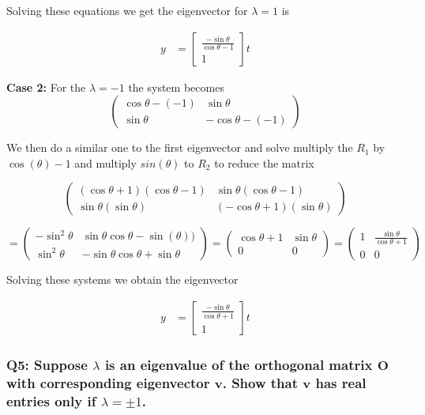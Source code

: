 \documentclass[8pt]{article}
\begin{document}
Solving these equations we get the eigenvector for $\lambda =1$ is 

\begin{align}
    y &= \begin{bmatrix}
           \frac{-\sin \theta }{\cos \theta -1} \\
           1
         \end{bmatrix}t 
\end{align}

\textbf{Case 2: }For the $\lambda =-1$ the system becomes
$$
\begin{pmatrix}
\cos \theta - (-1) & \sin \theta \\
\sin \theta & -\cos \theta -  (-1)
\end{pmatrix} 
$$

We then do a similar one to the first eigenvector and solve multiply the $R_1$ by $\cos(\theta) -1$ and multiply $sin(\theta)$ to $R_2$ to reduce the matrix

$$
\begin{pmatrix}
(\cos \theta + 1)(\cos \theta -1) & \sin \theta (\cos \theta - 1)\\
\sin \theta (\sin \theta) & (-\cos \theta +1)(\sin \theta)
\end{pmatrix} 
$$

$$
= \begin{pmatrix}
-\sin^2 \theta & \sin \theta \cos \theta - \sin(\theta))\\
\sin^2 \theta & -\sin \theta\cos \theta +\sin \theta
\end{pmatrix} =
\begin{pmatrix}
\cos \theta +1 & \sin \theta \\
0 & 0
\end{pmatrix} =
\begin{pmatrix}
1 & \frac{\sin \theta}{\cos \theta +1} \\
0 & 0
\end{pmatrix}
$$


Solving these systems we obtain the eigenvector 

\begin{align}
    y &= \begin{bmatrix}
           \frac{-\sin \theta }{\cos \theta +1} \\
           1
         \end{bmatrix}t 
\end{align}

\subsubsection*{Q5: Suppose \(\lambda\) is an eigenvalue of the orthogonal matrix \(\mathbf{O}\) with corresponding eigenvector \(\mathbf{v}\). Show that \(\mathbf{v}\) has real entries only if \(\lambda = \pm 1\).}
\end{document}

